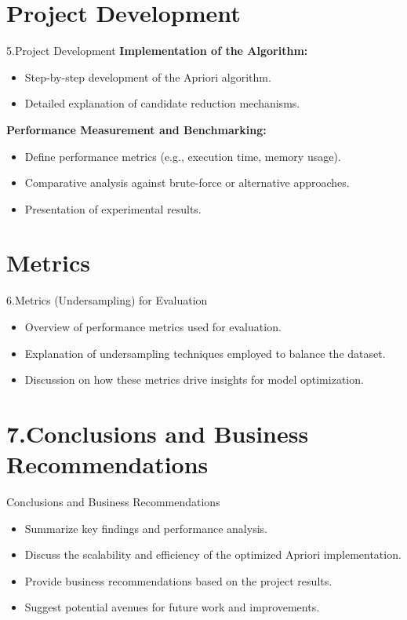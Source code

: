 \documentclass{beamer}
\begin{document}
\section{Project Development}

\begin{frame}{5.Project Development}
    \textbf{Implementation of the Algorithm:}
    \begin{itemize}
        \item Step-by-step development of the Apriori algorithm.
        \item Detailed explanation of candidate reduction mechanisms.
    \end{itemize}
    \vspace{0.5em}
    \textbf{Performance Measurement and Benchmarking:}
    \begin{itemize}
        \item Define performance metrics (e.g., execution time, memory usage).
        \item Comparative analysis against brute-force or alternative approaches.
        \item Presentation of experimental results.
    \end{itemize}
\end{frame}

\section{Metrics}

\begin{frame}{6.Metrics (Undersampling) for Evaluation}
    \begin{itemize}
        \item Overview of performance metrics used for evaluation.
        \item Explanation of undersampling techniques employed to balance the dataset.
        \item Discussion on how these metrics drive insights for model optimization.
    \end{itemize}
\end{frame}

\section{7.Conclusions and Business Recommendations}

\begin{frame}{Conclusions and Business Recommendations}
    \begin{itemize}
        \item Summarize key findings and performance analysis.
        \item Discuss the scalability and efficiency of the optimized Apriori implementation.
        \item Provide business recommendations based on the project results.
        \item Suggest potential avenues for future work and improvements.
    \end{itemize}
\end{frame}
\end{document}

